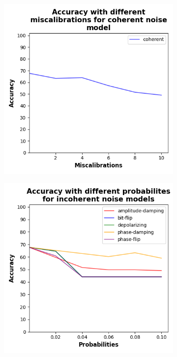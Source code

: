 \begin{figure}[!h]
  \centering

  \begin{subfigure}{0.45\textwidth}
      \includegraphics[width=\linewidth]{figures/evaluation_results/diabetes/pqc/figures/accuracy-coherent.png}
      \label{fig:diabetes1}
  \end{subfigure} \qquad
  \begin{subfigure}{0.45\textwidth}
      \includegraphics[width=\linewidth]{figures/evaluation_results/diabetes/pqc/figures/accuracy-incoherent.png}
      \label{fig:diabetes2}
  \end{subfigure}


\end{figure}

